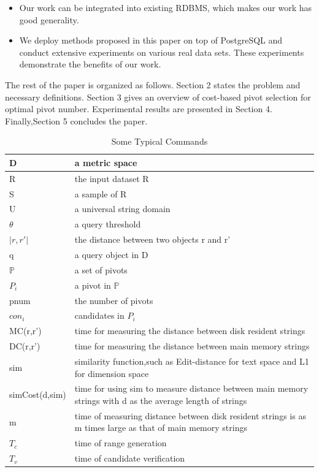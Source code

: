 \documentclass{vldb}
\begin{document}
\begin{itemize}
\item Our work can be integrated into existing RDBMS,
which makes our work has good generality.
\end{itemize}
\begin{itemize}
\item We deploy methods proposed in this paper on top of PostgreSQL and conduct extensive experiments on various real data sets. These experiments demonstrate the benefits of our work.
\end{itemize}
The rest of the paper is organized as follows. Section 2 states the problem and necessary definitions. Section 3 gives an overview of cost-based pivot selection for optimal pivot number. Experimental results are presented in Section 4. Finally,Section 5 concludes the paper.

\begin{table}
\centering
\caption{Some Typical Commands}
\begin{tabular}{|l||l|} 
\hline
D & a metric space  \\
\hline
R & the input dataset R  \\
\hline
S&  a sample of R   \\
\hline
U&  a universal string domain   \\
\hline

 $\theta$& a query threshold  \\
\hline
$|r,r'|$& the distance between two objects r and r' \\
\hline
q& a query object in D \\
\hline
$\mathbb{P}$ & a set of pivots\\
\hline
$P_i$& a pivot in $\mathbb{P}$ \\
\hline
pnum & the number of pivots \\
\hline
$con_i$&  candidates in $P_i$  \\
\hline
MC(r,r')&  time for measuring the distance between disk resident strings   \\
\hline
DC(r,r')&  time for measuring the distance between main memory strings \\
\hline
sim&  similarity function,such as Edit-distance for text space and L1 for dimension space \\
\hline
simCost(d,sim)& time for using sim to measure distance between main memory strings with d as the average length of strings    \\
\hline
m& time of measuring distance between disk resident strings is as m times large as that of main memory strings \\
\hline
$T_c$& time of range generation\\
\hline
$T_v$& time of candidate verification\\
\hline
\end{tabular}
\end{table}
\end{document}
